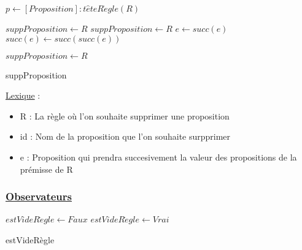 \documentclass{article}
\begin{document}
\clearpage

\begin{algorithm}
    \SetAlgoLined
    \KwResult{[Règle]}
    
    \begin{algorithmic}
    
        \STATE $p \gets [Proposition] : t\hat{e}teR\grave{e}gle(R)$
        
            \STATE $suppProposition \gets R$
        \ELSE
                \STATE $suppProposition \gets R$
            \ELSE
                    \STATE $e \gets succ(e)$
                \ENDWHILE
                \STATE $succ(e) \gets succ(succ(e))$
                
                \STATE $suppProposition \gets R$
            \ENDIF
        \ENDIF
    
    \end{algorithmic}
    \caption{suppProposition} 
\end{algorithm}

\underline{Lexique} :
\begin{itemize}
    \item R : La règle où l'on souhaite supprimer une proposition
    \item id : Nom de la proposition que l'on souhaite surpprimer
    \item e : Proposition qui prendra succesivement la valeur des propositions de la prémisse de R
\end{itemize}

\subsubsection{\underline{Observateurs}}
\begin{algorithm}
    \SetAlgoLined
    \KwResult{[Booléen]}
    
    \begin{algorithmic}
    
            \STATE $estVideR\grave{e}gle \gets Faux$
        \ELSE
            \STATE $estVideR\grave{e}gle \gets Vrai$
        \ENDIF

    
    \end{algorithmic}
    \caption{estVideRègle} 
\end{algorithm}
\end{document}
